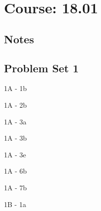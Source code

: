 \chapter{Course: 18.01}
\section{Notes}


\section{Problem Set 1}

\begin{problem}{1A - 1b}
\end{problem}
\begin{solution}
\end{solution}

\begin{problem}{1A - 2b}
\end{problem}
\begin{solution}
\end{solution}

\begin{problem}{1A - 3a}
\end{problem}
\begin{solution}
\end{solution}

\begin{problem}{1A - 3b}
\end{problem}
\begin{solution}
\end{solution}

\begin{problem}{1A - 3e}
\end{problem}
\begin{solution}
\end{solution}

\begin{problem}{1A - 6b}
\end{problem}
\begin{solution}
\end{solution}

\begin{problem}{1A - 7b}
\end{problem}
\begin{solution}
\end{solution}


\begin{problem}{1B - 1a}
\end{problem}
\begin{solution}
\end{solution}

